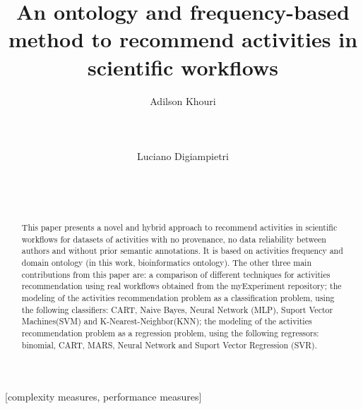 \documentclass{acm_proc_article-sp}
\begin{document}
\title{An ontology and frequency-based method to recommend activities in scientific workflows}


\author{
\alignauthor
Adilson Khouri\\
       \\
       \\
       \\
\alignauthor
Luciano Digiampietri\\
       \\
       \\
       \\
}

\maketitle
\begin{abstract}
This paper presents a novel and hybrid approach to recommend activities in scientific workflows for datasets of activities with no provenance, no data reliability between authors and without prior semantic annotations. It is based on activities frequency and domain ontology (in this work, bioinformatics ontology). The other three main contributions from this paper are: a comparison of different techniques for activities recommendation using real workflows obtained from the myExperiment repository; the modeling of the activities recommendation problem as a classification problem, using the following classifiers: CART, Naive Bayes, Neural Network (MLP), Suport Vector Machines(SVM) and K-Nearest-Neighbor(KNN); the modeling of the activities recommendation problem as a regression problem, using the following regressors: binomial, CART, MARS, Neural Network and Suport Vector Regression (SVR).
\end{abstract}

[complexity measures, performance measures]
\end{document}

